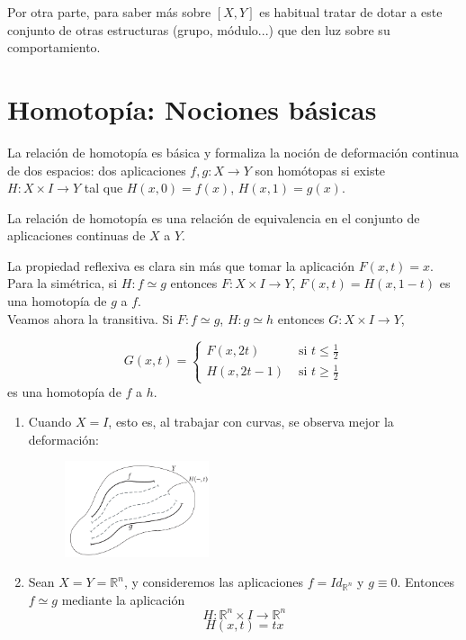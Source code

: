 Por otra parte, para saber más sobre $[X, Y]$ es habitual tratar de dotar a este conjunto de otras estructuras (grupo, módulo...) que den luz sobre su comportamiento. 

\section{Homotopía: Nociones básicas}\label{sec:homotbas}
La relación de homotopía es básica y formaliza la noción de deformación continua de dos espacios: dos aplicaciones $f, g : X\longrightarrow Y$ son homótopas si existe $H : X \times I \longrightarrow Y$ tal que $H(x, 0) = f(x)$, $H(x, 1) = g(x)$. 
\begin{prop}
La relación de homotopía es una relación de equivalencia en el conjunto de aplicaciones continuas de $X$ a $Y$.
\end{prop}
\begin{demo} 
La propiedad reflexiva es clara sin más que tomar la aplicación $F(x,t) = x$.\\
Para la simétrica, si $H : f \simeq g$ entonces $F : X \times I \longrightarrow Y$, $F(x, t) = H(x, 1-t)$ es una homotopía de $g$ a $f$.\\
Veamos ahora la transitiva. Si $F : f \simeq g$, $H : g \simeq h$ entonces $G : X \times I \longrightarrow Y$,

$$G(x, t) = 
\begin{cases}
	F(x, 2t) 	& 	\text{ si } t \leq \frac{1}{2}\\
	H(x, 2t - 1)& 	\text{ si } t \geq \frac{1}{2}
\end{cases}$$ 
es una homotopía de $f$ a $h$.
\end{demo}
\begin{ejems}
\begin{enumerate}
\item \label{ej1:1} Cuando $X = I$, esto es, al trabajar con curvas, se observa mejor la deformación:
\begin{figure}[h]
\centering
\includegraphics[width=0.4\textwidth]{images/homotcamin.pdf}
\end{figure}
\item \label{ej1:2} Sean $X = Y = \mathbb{R}^n$, y consideremos las aplicaciones $f = Id_{\mathbb{R}^n}$ y $g \equiv 0$. Entonces $f \simeq g$ mediante la aplicación
$$H : \mathbb{R}^n \times I \longrightarrow \mathbb{R}^n$$ $$H(x, t) = tx$$
\end{enumerate}
\end{ejems}
